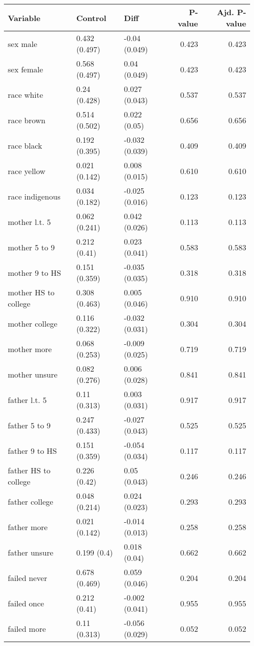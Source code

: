 \documentclass[
]{article}
\begin{document}
\begin{longtable}[t]{lllrr}
\toprule
Variable & Control & Diff & P-value & Ajd. P-value\\
\midrule\relax
sex male & 0.432 (0.497) & -0.04 (0.049) & 0.423 & 0.423\\
sex female & 0.568 (0.497) & 0.04 (0.049) & 0.423 & 0.423\\
race white & 0.24 (0.428) & 0.027 (0.043) & 0.537 & 0.537\\
race brown & 0.514 (0.502) & 0.022 (0.05) & 0.656 & 0.656\\
race black & 0.192 (0.395) & -0.032 (0.039) & 0.409 & 0.409\\
\addlinespace
race yellow & 0.021 (0.142) & 0.008 (0.015) & 0.610 & 0.610\\
race indigenous & 0.034 (0.182) & -0.025 (0.016) & 0.123 & 0.123\\
mother l.t. 5 & 0.062 (0.241) & 0.042 (0.026) & 0.113 & 0.113\\
mother 5 to 9 & 0.212 (0.41) & 0.023 (0.041) & 0.583 & 0.583\\
mother 9 to HS & 0.151 (0.359) & -0.035 (0.035) & 0.318 & 0.318\\
\addlinespace
mother HS to college & 0.308 (0.463) & 0.005 (0.046) & 0.910 & 0.910\\
mother college & 0.116 (0.322) & -0.032 (0.031) & 0.304 & 0.304\\
mother more & 0.068 (0.253) & -0.009 (0.025) & 0.719 & 0.719\\
mother unsure & 0.082 (0.276) & 0.006 (0.028) & 0.841 & 0.841\\
father l.t. 5 & 0.11 (0.313) & 0.003 (0.031) & 0.917 & 0.917\\
\addlinespace
father 5 to 9 & 0.247 (0.433) & -0.027 (0.043) & 0.525 & 0.525\\
father 9 to HS & 0.151 (0.359) & -0.054 (0.034) & 0.117 & 0.117\\
father HS to college & 0.226 (0.42) & 0.05 (0.043) & 0.246 & 0.246\\
father college & 0.048 (0.214) & 0.024 (0.023) & 0.293 & 0.293\\
father more & 0.021 (0.142) & -0.014 (0.013) & 0.258 & 0.258\\
\addlinespace
father unsure & 0.199 (0.4) & 0.018 (0.04) & 0.662 & 0.662\\
failed never & 0.678 (0.469) & 0.059 (0.046) & 0.204 & 0.204\\
failed once & 0.212 (0.41) & -0.002 (0.041) & 0.955 & 0.955\\
failed more & 0.11 (0.313) & -0.056 (0.029) & 0.052 & 0.052\\
\bottomrule
\end{longtable}
\end{document}
